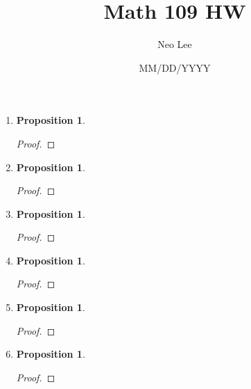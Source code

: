 \documentclass{article}
\title{Math 109 HW}
\author{Neo Lee}
\date{MM/DD/YYYY}
\newtheorem{prop}[thm]{Proposition}
\begin{document}
 

\maketitle 

\begin{enumerate}
\item 
\begin{prop}
    
\end{prop}
\begin{proof}

\end{proof}

\item 
\begin{prop}

\end{prop}
\begin{proof}

\end{proof}

\item \begin{prop}

\end{prop}
\begin{proof}

\end{proof}

\item 
\begin{prop}
     
\end{prop}
\begin{proof}
    
\end{proof}

\item 
\begin{prop}
   
\end{prop}
\begin{proof}

\end{proof}

\item 
\begin{prop}
    
\end{prop}
\begin{proof}


\end{proof}
\end{enumerate}
\end{document}
